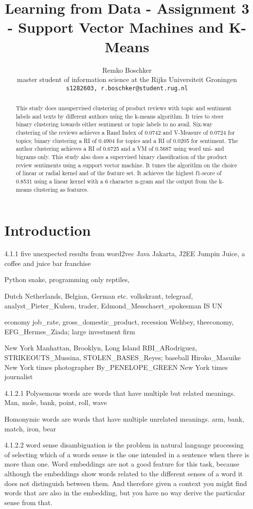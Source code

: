 \documentclass[11pt]{article}
\title{Learning from Data - Assignment 3 - Support Vector Machines and K-Means}
\author{Remko Boschker \\
  master student of information science at the Rijks Universiteit Groningen \\
  {\tt s1282603, r.boschker@student.rug.nl} }
\date{}
\begin{document}
\maketitle
\begin{abstract}

This study does unsupervised clustering of product reviews with topic and sentiment labels and texts by different authors using the k-means algorithm. It tries to steer binary clustering towards either sentiment or topic labels to no avail. Six-way clustering of the reviews achieves a Rand Index of 0.0742 and V-Measure of 0.0724 for topics; binary clustering a RI of 0.4904 for topics and a RI of 0.0205 for sentiment. The author clustering achieves a RI of 0.6725 and a VM of 0.5687 using word uni- and bigrams only. This study also does a supervised binary classification of the product review sentiments using a support vector machine. It tunes the algorithm on the choice of linear or radial kernel and of the feature set. It achieves the highest f1-score of 0.8531 using a linear kernel with a 6 character n-gram and the output from the k-means clustering as features.

\end{abstract}

\section{Introduction}

4.1.1 five unexpected results from word2vec
Java
Jakarta, J2EE
Jumpin Juice, a coffee and juice bar franchise

Python
snake, programming
only reptiles,

Dutch
Netherlands, Belgian, German etc.
volkskrant, telegraaf, analyst_Pieter_Kulsen, trader, Edmond_Messchaert_spokesman IS UN

economy
job_rate, gross_domestic_product, recession
Wehbey, theeconomy, EFG_Hermes_Ziada; large investment firm

New York
Manhattan, Brooklyn, Long Island
RBI_ARodriguez, STRIKEOUTS_Mussina, STOLEN_BASES_Reyes; baseball
Hiroko_Masuike New York times photographer
By_PENELOPE_GREEN New York times journalist

4.1.2.1
Polysemous words are words that have multiple but related meanings.
Man, mole, bank, point, roll, wave

Homonymic words are words that have multiple unrelated meanings.
arm, bank, match, iron, bear

4.1.2.2
word sense disambiguation is the problem in natural language processing of selecting which of a words sense is the one intended in a sentence when there is more than one. Word embeddings are not a good feature for this task, because although the embeddings show words related to the different senses of a word it does not distinguish between them. And therefore given a context you might find words that are also in the embedding, but you have no way derive the particular sense from that.
\end{document}
